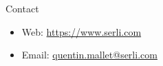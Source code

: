 \documentclass[final,hyperref={pdfpagelabels=false}]{beamer}
\begin{document}
\begin{frame}[t]
\begin{columns}[t]
\begin{column}{.465\textwidth}

\begin{block}{Contact}

\begin{itemize}
\item Web: \href{https://www.serli.com}{https://www.serli.com}
\item Email: \href{mailto:quentin.mallet@serli.com}{quentin.mallet@serli.com}
\end{itemize}

\end{block}


\end{column} %

\begin{column}{.015\textwidth}\end{column} %

\end{columns} %

\end{frame} %
\end{document}

